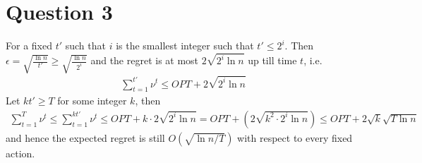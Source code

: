 \documentclass[a4paper,12pt]{article}
\theoremstyle{definition}
\begin{document}
\begin{enumerate}[(a)]


 

 
\end{enumerate}

\section*{Question 3}
For a fixed $t'$ such that $i$ is the smallest integer such that $t'\leq2^i$. Then $\epsilon=\sqrt{\frac{\ln n}{t'}}\geq\sqrt{\frac{\ln n}{2^i}}$ and the regret is at most $2\sqrt{2^i\ln n}$ up till time $t$, i.e.
\begin{align*}
\sum_{t=1}^{t'}\nu^t \leq OPT + 2\sqrt{2^i\ln n}
\end{align*}
Let $kt'\geq T$ for some integer $k$, then
\begin{align*}
\sum_{t=1}^{T}\nu^t \leq\sum_{t=1}^{kt'}\nu^t \leq OPT + k\cdot 2\sqrt{2^i\ln n}=OPT + (2\sqrt{k^2\cdot 2^i\ln n}) \leq OPT + 2\sqrt{k}\sqrt{T\ln n}
\end{align*}
and hence the expected regret is still $O(\sqrt{\ln n/T})$ with respect to every fixed action.
\end{document}
